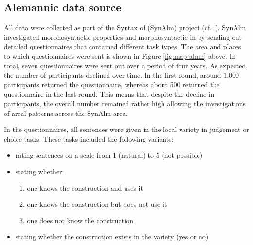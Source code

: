 \documentclass[output=paper,colorlinks,citecolor=brown]{langscibook}
\begin{document}
\subsection{Alemannic data source}\label{subsect:alm-source}

All  data were collected as part of the Syntax of  (SynAlm) project (cf.~\citealp{brandner2015syntax}). SynAlm investigated morphosyntactic properties and morphosyntactic  in  by sending out detailed questionnaires that contained different task types. The area and places to which questionnaires were sent is shown in Figure \ref{fig:map-almn} above. In total, seven questionnaires were sent out over a period of four years. As expected, the number of participants declined over time. In the first round, around 1,000 participants returned the questionnaire, whereas about 500 returned the questionnaire in the last round. This means that despite the decline in participants, the overall number remained rather high allowing the investigations of areal patterns across the SynAlm area.

In the questionnaires, all sentences were given in the local  variety in judgement or choice tasks. These tasks included the following variants:
\begin{itemize}
    \item rating sentences on a scale from 1 (natural) to 5 (not possible)
    \item stating whether:
    \begin{enumerate}[label=\alph*.]
    \item one knows the construction and uses it
    \item one knows the construction but does not use it  
    \item one does not know the construction
    \end{enumerate}
    \item stating whether the construction exists in the variety (yes or no)
\end{itemize}
\end{document}
